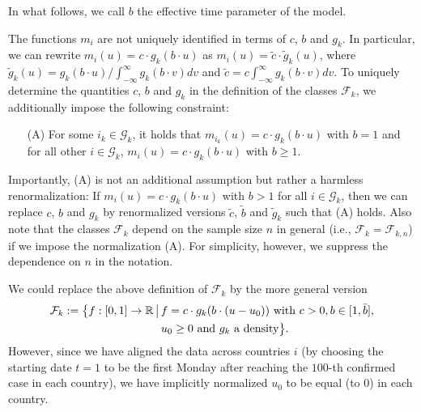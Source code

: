 \documentclass[a4paper,12pt]{article}
\numberwithin{equation}{section}
\begin{document}
In what follows, we call $b$ the effective time parameter of the model. 


\begin{remark}
The functions $m_i$ are not uniquely identified in terms of $c$, $b$ and $g_k$. In particular, we can rewrite $m_i(u) = c \cdot g_k(b \cdot u)$ as $m_i(u) = \tilde{c} \cdot \tilde{g}_k(u)$, where $\tilde{g}_k(u) = g_k(b \cdot u) / \int_{-\infty}^\infty g_k(b \cdot v) dv$ and $\tilde{c} = c \int_{-\infty}^\infty g_k(b \cdot v) dv$. To uniquely determine the quantities $c$, $b$ and $g_k$ in the definition of the classes $\mathcal{F}_k$, we additionally impose the following constraint: 
\begin{itemize}[leftmargin=0.75cm]
\item[(A)] For some $i_k \in \mathcal{G}_k$, it holds that $m_{i_k}(u) = c \cdot g_k(b \cdot u)$ with $b = 1$ and for all other $i \in \mathcal{G}_k$, $m_i(u) = c \cdot g_k(b \cdot u)$ with $b \ge 1$. 
\end{itemize}
Importantly, (A) is not an additional assumption but rather a harmless renormalization: If $m_i(u) = c \cdot g_k(b \cdot u)$ with $b > 1$ for all $i \in \mathcal{G}_k$, then we can replace $c$, $b$ and $g_k$ by renormalized versions $\tilde{c}$, $\tilde{b}$ and $\tilde{g}_k$ such that (A) holds. Also note that the classes $\mathcal{F}_k$ depend on the sample size $n$ in general (i.e., $\mathcal{F}_k = \mathcal{F}_{k,n}$) if we impose the normalization (A). For simplicity, however, we suppress the dependence on $n$ in the notation. 
\end{remark}


\pagebreak 
\begin{remark}
We could replace the above definition of $\mathcal{F}_k$ by the more general version 
\begin{align*}
\mathcal{F}_k := \big\{ f:[0, 1] \rightarrow \mathbb{R} \,\big|\, & f = c \cdot g_k(b \cdot (u-u_0)) \text{ with } c>0, b \in [1, \bar{b}], \\ & u_0 \ge 0 \text{ and } g_k \text{ a density} \big\}. 
\end{align*}
However, since we have aligned the data across countries $i$ (by choosing the starting date $t=1$ to be the first Monday after reaching the $100$-th confirmed case in each country), we have implicitly normalized $u_0$ to be equal (to $0$) in each country. 
\end{remark}
\end{document}
